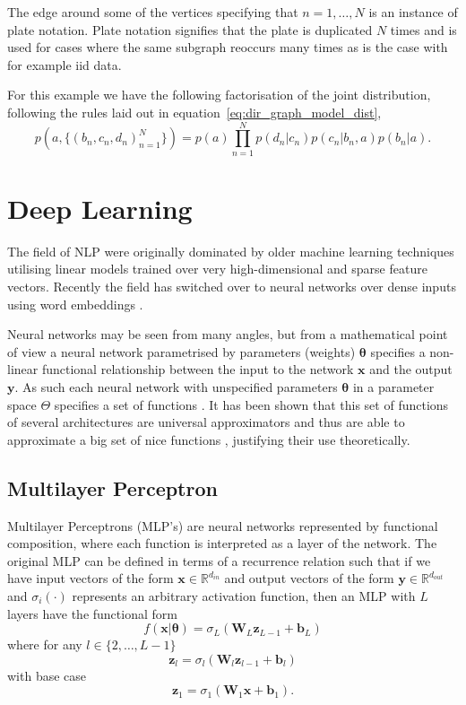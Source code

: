 The edge around some of the vertices specifying that $n = 1, \dots, N$ is an
instance of plate notation. Plate notation signifies that the plate is
duplicated $N$ times and is used for cases where the same subgraph reoccurs many
times as is the case with for example iid data.

For this example we have the following factorisation of the joint distribution,
following the rules laid out in equation~\eqref{eq:dir_graph_model_dist},
\begin{equation*}
  p(a, \{(b_n, c_n, d_n)_{n=1}^N\}) = p(a)\prod_{n=1}^Np(d_n | c_n)p(c_n | b_n, a)p(b_n | a).
\end{equation*}

\section{Deep Learning}
The field of NLP were originally dominated by older machine learning
techniques utilising linear models trained over very high-dimensional and sparse
feature vectors. Recently the field has switched over to neural networks over
dense inputs using word embeddings \cite[p.~1 - 2]{goldberg2015primer}.

Neural networks may be seen from many angles, but from a mathematical point of
view a neural network parametrised by parameters (weights) $\bm{\theta}$
specifies a non-linear functional relationship between the input to the network $\bm{x}$
and the output $\bm{y}$. As such each neural network with unspecified parameters
$\bm{\theta}$ in a parameter space $\Theta$ specifies a set of functions
\cite{Bishop:2006}. It has been shown that this set of functions of several
architectures are universal approximators and thus are able to approximate a big
set of nice functions \cite{Hornik:1989:MFN:70405.70408, Cybenko1989univapprox},
justifying their use theoretically.

\subsection{Multilayer Perceptron}
Multilayer Perceptrons (MLP's) are neural networks represented by functional composition, where each
function is interpreted as a layer of the network. The original MLP can be defined in
terms of a recurrence relation such that if we have input vectors of the form $\bm{x} \in
\mathbb{R}^{d_{in}}$ and output vectors of the form $\bm{y} \in
\mathbb{R}^{d_{out}}$ and $\sigma_i( \cdot )$ represents an arbitrary activation
function, then an MLP with $L$ layers have the functional form
\begin{equation}
  f(\bm{x} | \bm{\theta}) = \sigma_L(\bm{W}_L \bm{z}_{L-1} + \bm{b}_{L})
\end{equation}
where for any $l \in \{2, \dots, L-1\}$
\begin{equation}
    \bm{z}_l = \sigma_l(\bm{W}_l \bm{z}_{l-1} + \bm{b}_l)
\end{equation}
with base case
\begin{equation}
  \bm{z}_1 = \sigma_1(\bm{W}_1 \bm{x} + \bm{b}_1).
\end{equation} \cite{BarberAppliedML}


